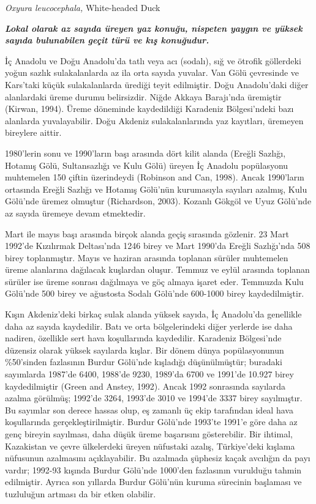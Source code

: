 \documentclass[
  a4paper,
  DIV=11,
  numbers=noendperiod]{scrartcl}
\begin{document}
\emph{Oxyura leucocephala,} White-headed Duck

\textbf{\emph{Lokal olarak az sayıda üreyen yaz konuğu, nispeten yaygın
ve yüksek sayıda bulunabilen geçit türü ve kış konuğudur.}}

İç Anadolu ve Doğu Anadolu'da tatlı veya acı (sodalı), sığ ve ötrofik
göllerdeki yoğun sazlık sulakalanlarda az ila orta sayıda yuvalar. Van
Gölü çevresinde ve Kars'taki küçük sulakalanlarda ürediği teyit
edilmiştir. Doğu Anadolu'daki diğer alanlardaki üreme durumu
belirsizdir. Niğde Akkaya Barajı'nda üremiştir (Kirwan, 1994). Üreme
döneminde kaydedildiği Karadeniz Bölgesi'ndeki bazı alanlarda
yuvalayabilir. Doğu Akdeniz sulakalanlarında yaz kayıtları, üremeyen
bireylere aittir.

1980'lerin sonu ve 1990'ların başı arasında dört kilit alanda (Ereğli
Sazlığı, Hotamış Gölü, Sultansazlığı ve Kulu Gölü) üreyen İç Anadolu
popülasyonu muhtemelen 150 çiftin üzerindeydi (Robinson and Can, 1998).
Ancak 1990'ların ortasında Ereğli Sazlığı ve Hotamış Gölü'nün
kurumasıyla sayıları azalmış, Kulu Gölü'nde üremez olmuştur (Richardson,
2003). Kozanlı Gökgöl ve Uyuz Gölü'nde az sayıda üremeye devam
etmektedir.

Mart ile mayıs başı arasında birçok alanda geçiş sırasında gözlenir. 23
Mart 1992'de Kızılırmak Deltası'nda 1246 birey ve Mart 1990'da Ereğli
Sazlığı'nda 508 birey toplanmıştır. Mayıs ve haziran arasında toplanan
sürüler muhtemelen üreme alanlarına dağılacak kuşlardan oluşur. Temmuz
ve eylül arasında toplanan sürüler ise üreme sonrası dağılmaya ve göç
almaya işaret eder. Temmuzda Kulu Gölü'nde 500 birey ve ağustosta Sodalı
Gölü'nde 600-1000 birey kaydedilmiştir.

Kışın Akdeniz'deki birkaç sulak alanda yüksek sayıda, İç Anadolu'da
genellikle daha az sayıda kaydedilir. Batı ve orta bölgelerindeki diğer
yerlerde ise daha nadiren, özellikle sert hava koşullarında kaydedilir.
Karadeniz Bölgesi'nde düzensiz olarak yüksek sayılarda kışlar. Bir dönem
dünya popülasyonunun \%50'sinden fazlasının Burdur Gölü'nde kışladığı
düşünülmüştür; buradaki sayımlarda 1987'de 6400, 1988'de 9230, 1989'da
6700 ve 1991'de 10.927 birey kaydedilmiştir (Green and Anstey, 1992).
Ancak 1992 sonrasında sayılarda azalma görülmüş; 1992'de 3264, 1993'de
3010 ve 1994'de 3337 birey sayılmıştır. Bu sayımlar son derece hassas
olup, eş zamanlı üç ekip tarafından ideal hava koşullarında
gerçekleştirilmiştir. Burdur Gölü'nde 1993'te 1991'e göre daha az genç
bireyin sayılması, daha düşük üreme başarısını gösterebilir. Bir
ihtimal, Kazakistan ve çevre ülkelerdeki üreyen nüfustaki azalış,
Türkiye'deki kışlama nüfusunun azalmasını açıklayabilir. Bu azalmada
şüphesiz kaçak avcılığın da payı vardır; 1992-93 kışında Burdur Gölü'nde
1000'den fazlasının vurulduğu tahmin edilmiştir. Ayrıca son yıllarda
Burdur Gölü'nün kuruma sürecinin başlaması ve tuzluluğun artması da bir
etken olabilir.
\end{document}
